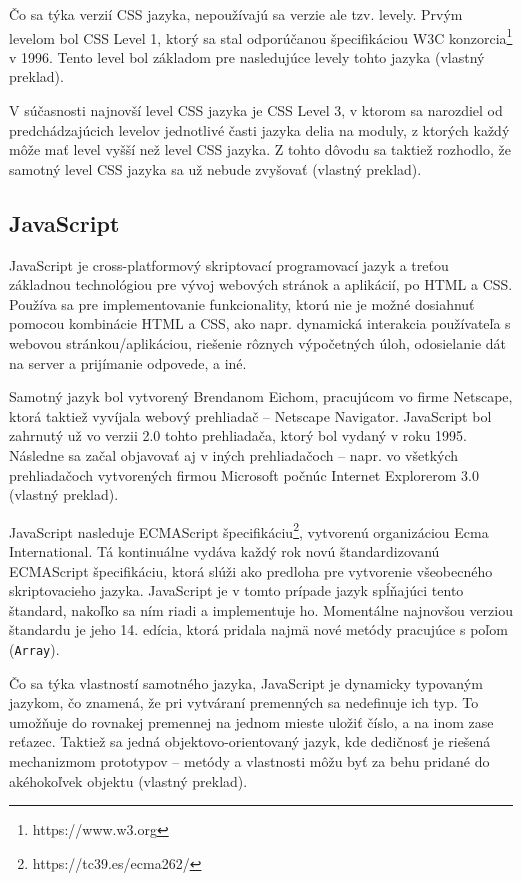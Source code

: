 Čo sa týka verzií CSS jazyka, nepoužívajú sa verzie ale tzv. levely. Prvým levelom bol CSS Level 1, ktorý sa stal odporúčanou špecifikáciou W3C konzorcia\footnote{https://www.w3.org} v 1996. Tento level bol základom pre nasledujúce levely tohto jazyka \cite{about_css} (vlastný preklad).

V súčasnosti najnovší level CSS jazyka je CSS Level 3, v ktorom sa narozdiel od predchádzajúcich levelov jednotlivé časti jazyka delia na moduly, z ktorých každý môže mať level vyšší než level CSS jazyka. Z tohto dôvodu sa taktiež rozhodlo, že samotný level CSS jazyka sa už nebude zvyšovať \cite{about_css} (vlastný preklad).

\subsection {JavaScript}
JavaScript je cross-platformový skriptovací programovací jazyk a treťou základnou technológiou pre vývoj webových stránok a aplikácií, po HTML a CSS. Používa sa pre implementovanie funkcionality, ktorú nie je možné dosiahnuť pomocou kombinácie HTML a CSS, ako napr. dynamická interakcia používateľa s webovou stránkou/aplikáciou, riešenie rôznych výpočetných úloh, odosielanie dát na server a prijímanie odpovede, a iné.

Samotný jazyk bol vytvorený Brendanom Eichom, pracujúcom vo firme Netscape, ktorá taktiež vyvíjala webový prehliadač -- Netscape Navigator. \newline JavaScript bol zahrnutý už vo verzii 2.0 tohto prehliadača, ktorý bol vydaný v roku 1995. Následne sa začal objavovať aj v iných prehliadačoch -- napr. vo všetkých prehliadačoch vytvorených firmou Microsoft počnúc Internet Explorerom 3.0 \cite{ecmascript_specification} (vlastný preklad). 

JavaScript nasleduje ECMAScript špecifikáciu\footnote{https://tc39.es/ecma262/}, vytvorenú organizáciou Ecma International. Tá kontinuálne vydáva každý rok novú štandardizovanú ECMAScript špecifikáciu, ktorá slúži ako predloha pre vytvorenie všeobecného skriptovacieho jazyka. JavaScript je v tomto prípade jazyk spĺňajúci tento štandard, nakoľko sa ním riadi a implementuje ho. Momentálne najnovšou verziou štandardu je jeho 14. edícia, ktorá pridala najmä nové metódy pracujúce s poľom (\texttt{Array}).

Čo sa týka vlastností samotného jazyka, JavaScript je dynamicky typovaným jazykom, čo znamená, že pri vytváraní premenných sa nedefinuje ich typ. To umožňuje do rovnakej premennej na jednom mieste uložiť číslo, a na inom zase reťazec. Taktiež sa jedná objektovo-orientovaný jazyk, kde dedičnosť je riešená mechanizmom prototypov -- metódy a vlastnosti môžu byť za behu pridané do akéhokoľvek objektu \cite{ecmascript_specification} (vlastný preklad).

